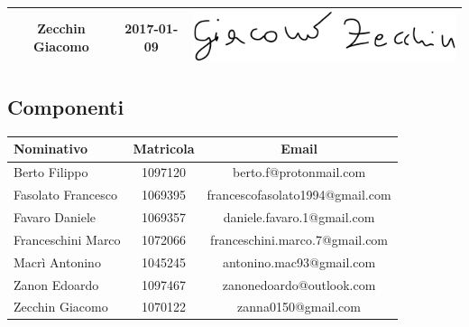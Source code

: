 \documentclass[../PianoDiProgetto_v4.0.0.tex]{subfiles}
\begin{document}
\begin{table}[h]
\begin{tabularx}{\textwidth}{C C C}
			Zecchin Giacomo & 2017-01-09 &	\includegraphics[scale=0.3]{Firme/gzecchin_firma} \\[1.2ex]
			\bottomrule
		\end{tabularx}
		
	\end{table}
	
\vfill
	
	\subsection{Componenti}
		\begin{table}[h]
	
		\begin{tabularx}{\textwidth}{lc C}
			\toprule
			\textbf{Nominativo} & \textbf{Matricola} & \textbf{Email} \\
			\midrule
			Berto Filippo & 1097120 & berto.f@protonmail.com \\
			Fasolato Francesco & 1069395 & francescofasolato1994@gmail.com  \\
			Favaro Daniele	& 1069357 & daniele.favaro.1@gmail.com\\
			Franceschini Marco & 1072066 & franceschini.marco.7@gmail.com\\
			Macrì Antonino & 1045245 & antonino.mac93@gmail.com\\
			Zanon Edoardo & 1097467 & zanonedoardo@outlook.com	 \\
			Zecchin Giacomo & 1070122 & zanna0150@gmail.com \\
			\bottomrule
		\end{tabularx}
		
		\end{table}		
\vfill			
\end{document}
